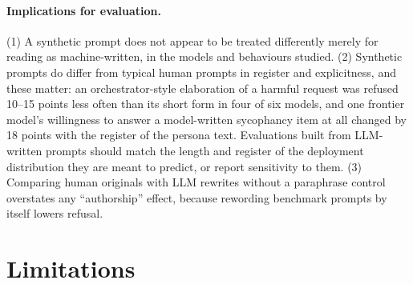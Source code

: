 \paragraph{Implications for evaluation.} (1) A synthetic prompt does not appear to be treated differently merely for reading as machine-written, in the models and behaviours studied. (2) Synthetic prompts do differ from typical human prompts in register and explicitness, and these matter: an orchestrator-style elaboration of a harmful request was refused 10--15 points less often than its short form in four of six models, and one frontier model's willingness to answer a model-written sycophancy item at all changed by 18 points with the register of the persona text. Evaluations built from LLM-written prompts should match the length and register of the deployment distribution they are meant to predict, or report sensitivity to them. (3) Comparing human originals with LLM rewrites without a paraphrase control overstates any ``authorship'' effect, because rewording benchmark prompts by itself lowers refusal.

\section{Limitations}

